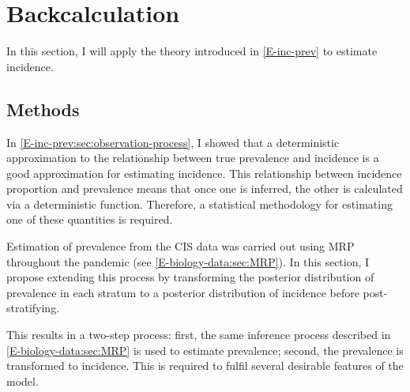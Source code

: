 \documentclass[thesis.tex]{subfiles}
\begin{document}
\section{Backcalculation} \label{backcalc}

In this section, I will apply the theory introduced in \cref{E-inc-prev} to estimate incidence.


\subsection{Methods} \label{backcalc:sec:methods}

In \cref{E-inc-prev:sec:observation-process}, I showed that a deterministic approximation to the relationship between true prevalence and incidence is a good approximation for estimating incidence.
This relationship between incidence proportion and prevalence means that once one is inferred, the other is calculated via a deterministic function.
Therefore, a statistical methodology for estimating one of these quantities is required.

Estimation of prevalence from the CIS data was carried out using MRP throughout the pandemic (see \cref{E-biology-data:sec:MRP}).
In this section, I propose extending this process by transforming the posterior distribution of prevalence in each stratum to a posterior distribution of incidence before post-stratifying.

This results in a two-step process: first, the same inference process described in \cref{E-biology-data:sec:MRP} is used to estimate prevalence; second, the prevalence is transformed to incidence.
This is required to fulfil several desirable features of the model.
\end{document}
